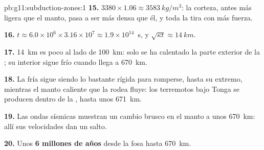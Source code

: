 \begin{solution}{pb:g11:subduction-zones:1}
\textbf{15.} $3380 \times 1.06 \approx \qty{3583}{kg/m^3}$: la corteza, antes
más ligera que el manto, pasa a ser más densa que él, y toda la  tira con
más fuerza.

\textbf{16.} $t \approx 6.0 \times 10^6 \times 3.16 \times 10^7 \approx
1.9 \times 10^{14}$~s, y $\sqrt{\kappa t} \approx \qty{14}{km}$.

\textbf{17.} \qty{14}{km} es poco al lado de \qty{100}{km}: solo se ha
calentado la parte exterior de la ; su interior sigue frío cuando llega a
\qty{670}{km}.

\textbf{18.} La  fría sigue siendo lo bastante rígida para romperse, hasta
su extremo, mientras el manto caliente que la rodea fluye: los terremotos bajo
Tonga se producen dentro de la , hasta unos \qty{671}{km}.

\textbf{19.} Las ondas sísmicas muestran un cambio brusco en el manto a unos
\qty{670}{km}: allí sus velocidades dan un salto.

\textbf{20.} Unos \textbf{6 millones de años} desde la fosa hasta
\qty{670}{km}.
\end{solution}

